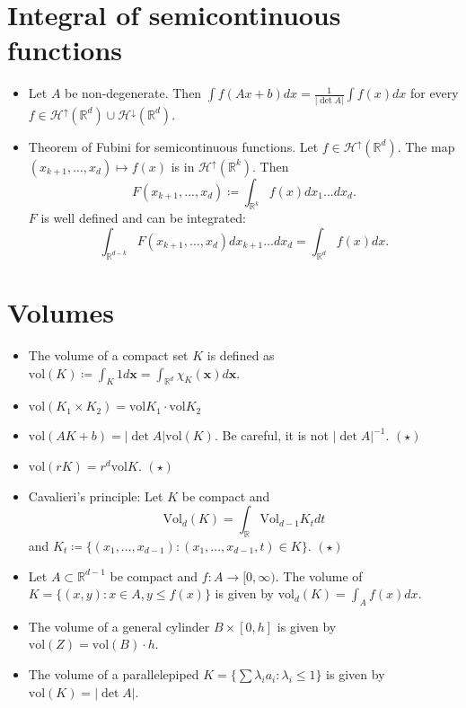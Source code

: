 \documentclass[a4paper, 11pt]{article}
\theoremstyle{plain}
\theoremstyle{definition}
\begin{document}
\section{Integral of semicontinuous functions}
\begin{itemize}
	\item Let $A$ be non-degenerate. Then $\int f(Ax+b)dx = \frac{1}{|\det A|}\int f(x)dx$ for every $f \in \mathcal H^{\uparrow}(\mathbb R^d) \cup \mathcal H^{\downarrow}(\mathbb R^d)$.
	
	\item Theorem of Fubini for semicontinuous functions. Let $f \in \mathcal H^{\uparrow}(\mathbb R^d)$. The map $(x_{k+1},...,x_d) \mapsto f(x)$ is in $\mathcal H^{\uparrow}(\mathbb R^k)$. Then 
	\[
		F(x_{k+1},...,x_d) \coloneqq \int_{\mathbb R^k}f(x)dx_1...dx_d.
	\]
	$F$ is well defined and can be integrated:
	\[
		\int_{\mathbb R^{d-k}} F(x_{k+1},...,x_d) dx_{k+1}...dx_d = \int_{\mathbb R^d} f(x)dx.
	\]
\end{itemize}

\section{Volumes} 
\begin{itemize}
	\item The volume of a compact set $K$ is defined as $\mathrm{vol}(K) \coloneqq \int_K 1 d\mathbf x = \int_{\mathbb R^d} \mathbb \chi_{K}(\mathbf x) d\mathbf x$.
	
	\item $\mathrm{vol}(K_1 \times K_2) = \mathrm{vol}K_1 \cdot \mathrm{vol}K_2$
	
	\item $\mathrm{vol}(AK+b) =|\det A| \mathrm{vol}(K)$. Be careful, it is not $|\det A|^{-1}$. $(\star)$
	
	\item $\mathrm{vol}(rK) = r^d\mathrm{vol}K$. $(\star)$
	
	\item Cavalieri's principle: Let $K$ be compact and $$\mathrm{Vol}_d(K) = \int_{\mathbb R} \mathrm{Vol}_{d-1}K_t dt$$ and $K_t \coloneqq \{ (x_1,...,x_{d-1}) : (x_1,...,x_{d-1}, t) \in K \}$. $(\star)$
	
	\item Let $A \subset \mathbb R^{d-1}$ be compact and $f: A \to [0,\infty)$. The volume of $K = \{ (x,y) : x \in A, y \leq f(x) \}$  is given by $\mathrm{vol}_d(K) = \int_A f(x)dx$.
	
	\item The volume of a general cylinder $B \times [0,h]$ is given by $\mathrm{vol}(Z) = \mathrm{vol}(B) \cdot h$.
	
	\item The volume of a parallelepiped $K = \{ \sum \lambda_i a_i : \lambda_i \leq 1 \}$ is given by $\mathrm{vol}(K) = |\det A|$.
\end{itemize}
\end{document}
